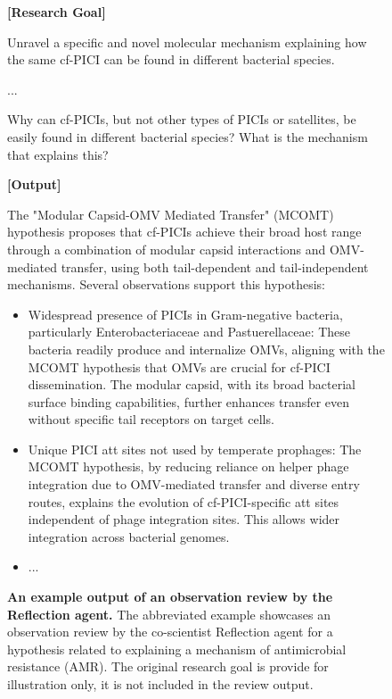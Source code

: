 \begin{figure}[htbp!]
\begin{tcolorbox}[
    colback=black!5!white,
    colframe=black!60!white,
    title=\textbf{Example output of an observation review by the Reflection Agent},
    fonttitle=\bfseries,
    arc=3mm,
    boxrule=1pt,
    bottomrule=2pt,
]
\footnotesize
\textbf{[Research Goal]}

Unravel a specific and novel molecular mechanism explaining how the same cf-PICI can be found in different bacterial species.

...

Why can cf-PICIs, but not other types of PICIs or satellites, be easily found in different bacterial species? What is the mechanism that explains this?

\textbf{[Output]}

The "Modular Capsid-OMV Mediated Transfer" (MCOMT) hypothesis proposes that cf-PICIs achieve their broad host range through a combination of modular capsid interactions and OMV-mediated transfer, using both tail-dependent and tail-independent mechanisms. Several observations support this hypothesis:
\begin{itemize}
    \item Widespread presence of PICIs in Gram-negative bacteria, particularly Enterobacteriaceae and Pastuerellaceae: These bacteria readily produce and internalize OMVs, aligning with the MCOMT hypothesis that OMVs are crucial for cf-PICI dissemination. The modular capsid, with its broad bacterial surface binding capabilities, further enhances transfer even without specific tail receptors on target cells.
    \item Unique PICI att sites not used by temperate prophages: The MCOMT hypothesis, by reducing reliance on helper phage integration due to OMV-mediated transfer and diverse entry routes, explains the evolution of cf-PICI-specific att sites independent of phage integration sites. This allows wider integration across bacterial genomes.
    \item ...
\end{itemize}
\end{tcolorbox}
\vspace{0.1cm}
\caption{\textbf{An example output of an observation review by the Reflection agent.} The abbreviated example showcases an observation review by the co-scientist Reflection agent for a hypothesis related to explaining a mechanism of antimicrobial resistance (AMR). The original research goal is provide for illustration only, it is not included in the review output.}
\label{fig:ex_observation}
\end{figure}


